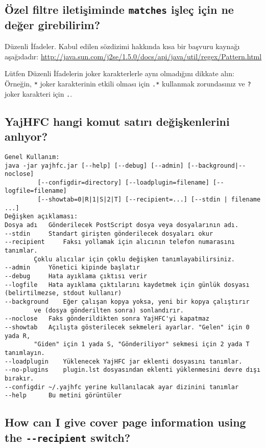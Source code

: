 \documentclass[a4paper,10pt]{scrartcl}
\begin{document}
\subsection{Özel filtre iletişiminde \texttt{matches} işleç için ne değer girebilirim?}

Düzenli İfadeler. Kabul edilen sözdizimi hakkında kısa bir başvuru kaynağı aşağıdadır:
\url{http://java.sun.com/j2se/1.5.0/docs/api/java/util/regex/Pattern.html}

Lütfen Düzenli İfadelerin joker karakterlerle aynı olmadığını dikkate alın:
Örneğin, \verb.*. joker karakterinin etkili olması için \verb#.*# kullanmak zorundasınız 
ve \verb#?# joker karakteri için \verb#.#.

\subsection{YajHFC hangi komut satırı değişkenlerini anlıyor?}

\begin{verbatim}
Genel Kullanım:
java -jar yajhfc.jar [--help] [--debug] [--admin] [--background|--noclose]
         [--configdir=directory] [--loadplugin=filename] [--logfile=filename]
         [--showtab=0|R|1|S|2|T] [--recipient=...] [--stdin | filename ...]
Değişken açıklaması:
Dosya adı	Gönderilecek PostScript dosya veya dosyalarının adı.
--stdin 	Standart girişten gönderilecek dosyaları okur
--recipient 	Faksı yollamak için alıcının telefon numarasını tanımlar.
		Çoklu alıcılar için çoklu değişken tanımlayabilirsiniz.
--admin		Yönetici kipinde başlatır
--debug		Hata ayıklama çıktısı verir
--logfile	Hata ayıklama çıktılarını kaydetmek için günlük dosyası (belirtilmezse, stdout kullanır)
--background	Eğer çalışan kopya yoksa, yeni bir kopya çalıştırır
		ve (dosya gönderilten sonra) sonlandırır.
--noclose	Faks gönderildikten sonra YajHFC'yi kapatmaz
--showtab	Açılışta gösterilecek sekmeleri ayarlar. "Gelen" için 0 yada R, 
		"Giden" için 1 yada S, "Gönderiliyor" sekmesi için 2 yada T tanımlayın.
--loadplugin	Yüklenecek YajHFC jar eklenti dosyasını tanımlar.
--no-plugins	plugin.lst dosyasından eklenti yüklenmesini devre dışı bırakır.
--configdir	~/.yajhfc yerine kullanılacak ayar dizinini tanımlar
--help		Bu metini görüntüler
\end{verbatim}




\subsection{How can I give cover page information using the \texttt{-{-}recipient} switch?}
\end{document}
